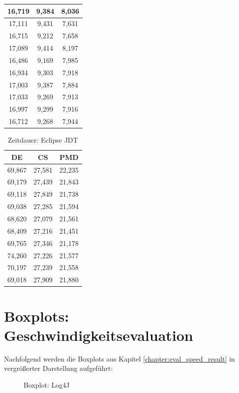 \begin{appendices}
\begin{table}[ht!]
{\begin{tabular}{c|c|c}
16,719&	9,384&	8,036\\\hline
		
17,111&	9,431&	7,631\\\hline
		
16,715&	9,212&	7,658\\\hline
		
17,089&	9,414&	8,197\\\hline
		
16,486&	9,169&	7,985\\\hline
		
16,934&	9,303&	7,918\\\hline
		
17,003&	9,387&	7,884\\\hline
		
17,033&	9,269&	7,913\\\hline
		
16,997&	9,299&	7,916\\\hline
		
16,712&	9,268&	7,944\\\hline
    \end{tabular}}
\end{table}



\begin{table}[ht!]
    \centering
    \begin{tabular}{c|c|c}
DE & CS &PMD\\\hline
69,867&27,581&22,235\\\hline
69,179&27,439&21,843\\\hline
69,118&27,849&21,738\\\hline
69,038&27,285&21,594\\\hline
68,620&27,079&21,561\\\hline
68,409&27,216&21,451\\\hline
69,765&27,346&21,178\\\hline
74,260&27,226&21,577\\\hline
70,197&27,239&21,558\\\hline
69,018&27,909&21,880\\\hline
    \end{tabular}
    \caption{Zeitdauer: Eclipse JDT}
    \label{tab:raw_eclipse}
\end{table}
\chapter{Boxplots: Geschwindigkeitsevaluation}\label{appendix:boxplots}
Nachfolgend werden die Boxplots aus Kapitel \ref{chapter:eval_speed_result} in vergrößerter Darstellung aufgeführt:
 \begin{figure}[ht!]

    \caption{Boxplot: Log4J}
  

\end{figure}
\end{appendices}
